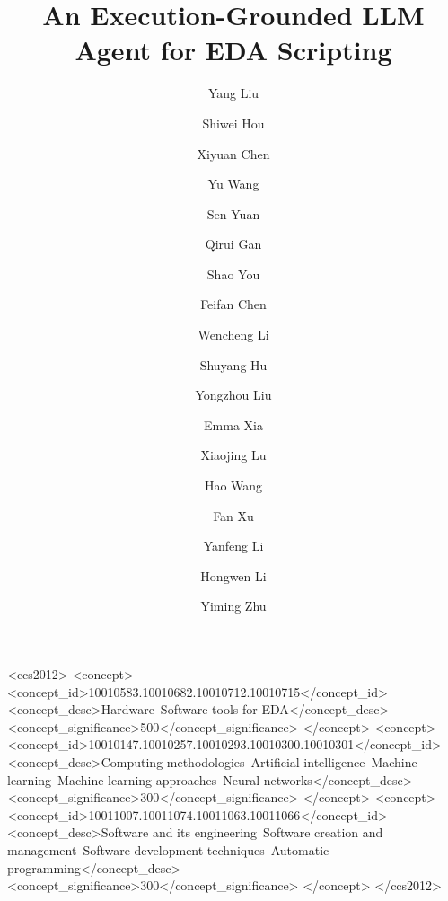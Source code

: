 \documentclass[anonymous, sigconf]{acmart}
\author@bx@wd=\textwidth\relax
\begin{document}
\title{An Execution-Grounded LLM Agent for EDA Scripting}

\author{Yang Liu}
\correspondingauthor
{}
\author{Shiwei Hou}
\author{Xiyuan Chen}
\author{Yu Wang}
\author{Sen Yuan}
\author{Qirui Gan}
\author{Shao You}
\author{Feifan Chen}
\author{Wencheng Li}
\author{Shuyang Hu}
\author{Yongzhou Liu}
\author{Emma Xia}
\author{Xiaojing Lu}
\author{Hao Wang}
\author{Fan Xu}
\author{Yanfeng Li}
\correspondingauthor
{}
\author{Hongwen Li}
\correspondingauthor
{}
\author{Yiming Zhu}


\renewcommand{\shortauthors}{Liu et al.}



\begin{CCSXML}
<ccs2012>
   <concept>
       <concept_id>10010583.10010682.10010712.10010715</concept_id>
       <concept_desc>Hardware~Software tools for EDA</concept_desc>
       <concept_significance>500</concept_significance>
   </concept>
   <concept>
       <concept_id>10010147.10010257.10010293.10010300.10010301</concept_id>
       <concept_desc>Computing methodologies~Artificial intelligence~Machine learning~Machine learning approaches~Neural networks</concept_desc>
       <concept_significance>300</concept_significance>
   </concept>
   <concept>
       <concept_id>10011007.10011074.10011063.10011066</concept_id>
       <concept_desc>Software and its engineering~Software creation and management~Software development techniques~Automatic programming</concept_desc>
       <concept_significance>300</concept_significance>
   </concept>
 </ccs2012>
\end{CCSXML}

\maketitle










\clearpage


\end{document}
